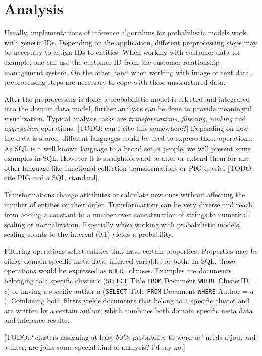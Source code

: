 \section{Analysis}

Usually, implementations of inference algorithms for probabilistic models work with generic IDs. Depending on the application, different preprocessing steps may be necessary to assign IDs to entities. When working with customer data for example, one can use the customer ID from the customer relationship management system. On the other hand when working with image or text data, preprocessing steps are necessary to cope with these unstructured data.

After the preprocessing is done, a probabilistic model is selected and integrated into the domain data model, further analysis can be done to provide meaningful visualization. Typical analysis tasks are \emph{transformations}, \emph{filtering}, \emph{ranking} and \emph{aggregation} operations. [TODO: can I cite this somewhere?] Depending on how the data is stored, different languages could be used to express those operations. As SQL is a well known language to a broad set of people, we will present some examples in SQL. However it is straightforward to alter or extend them for any other language like functional collection transformations or PIG queries [TODO: cite PIG and a SQL standard].

Transformations change attributes or calculate new ones without affecting the number of entities or their order. Transformations can be very diverse and reach from adding a constant to a number over concatenation of strings to numerical scaling or normalization. Especially when working with probabilistic models, scaling counts to the interval (0,1) yields a probability.

Filtering operations select entities that have certain properties. Properties may be either domain specific meta data, inferred variables or both. In SQL, those operations would be expressed as \texttt{WHERE} clauses. Examples are documents belonging to a specific cluster $c$ (\texttt{SELECT} Title \texttt{FROM} Document \texttt{WHERE} ClusterID = $c$) or having a specific author $a$ (\texttt{SELECT} Title \texttt{FROM} Document \texttt{WHERE} Author = $a$). Combining both filters yields documents that belong to a specific cluster and are written by a certain author, which combines both domain specific meta data and inference results.

[TODO: ``clusters assigning at least 50\,\% probability to word $w$'' needs a join and a filter; are joins some special kind of analysis? i'd say no.]

